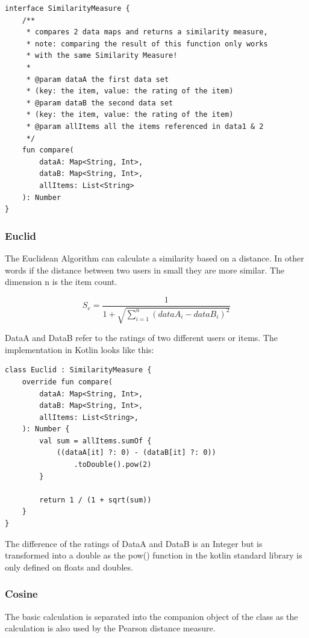 \begin{verbatim}
interface SimilarityMeasure {
    /**
     * compares 2 data maps and returns a similarity measure,
     * note: comparing the result of this function only works 
     * with the same Similarity Measure!
     *
     * @param dataA the first data set
     * (key: the item, value: the rating of the item)
     * @param dataB the second data set
     * (key: the item, value: the rating of the item)
     * @param allItems all the items referenced in data1 & 2
     */
    fun compare(
        dataA: Map<String, Int>,
        dataB: Map<String, Int>,
        allItems: List<String>
    ): Number
}
\end{verbatim}

\subsubsection{Euclid}

The Euclidean Algorithm can calculate a similarity based on a distance. In other words if the distance between two users in small they are more similar. The dimension n is the item count.

\begin{equation}
S_{e} = \frac{1}{1+\sqrt{\sum_{i=1}^{n}{(dataA_i - dataB_i)^2}}}
\label{euklid}
\end{equation}

DataA and DataB refer to the ratings of two different users or items.
The implementation in Kotlin looks like this:

\begin{verbatim}
class Euclid : SimilarityMeasure {
    override fun compare(
        dataA: Map<String, Int>,
        dataB: Map<String, Int>,
        allItems: List<String>,
    ): Number {
        val sum = allItems.sumOf {
            ((dataA[it] ?: 0) - (dataB[it] ?: 0))
                .toDouble().pow(2)
        }

        return 1 / (1 + sqrt(sum))
    }
}
\end{verbatim}

The difference of the ratings of DataA and DataB is an Integer but is transformed into a double as the pow() function in the kotlin standard library is only defined on floats and doubles.

\subsubsection{Cosine}

The basic calculation is separated into the companion object of the class as the calculation is also used by the Pearson distance measure. 

